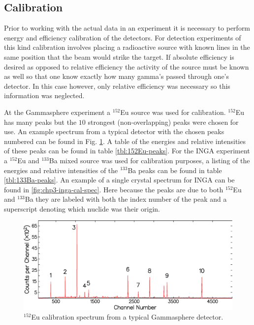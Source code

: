 \subsection{Calibration}
\label{ssec:exp-pr-data-proc-cal}
Prior to working with the actual data in an experiment it is necessary to perform energy and efficiency calibration of the detectors. For \gr{} detection experiments of this kind calibration involves placing a radioactive source with known lines in the same position that the beam would strike the target. If absolute efficiency is desired as opposed to relative efficiency the activity of the source must be known as well so that one know exactly how many gamma's passed through one's detector. In this case however, only relative efficiency was necessary so this information was neglected.

At the Gammasphere experiment a $^{152}$Eu source was used for calibration. $^{152}$Eu has many peaks but the $10$ strongest (non-overlapping) peaks were chosen for use. An example spectrum from a typical detector with the chosen peaks numbered can be found in Fig. \ref{fig:chp3-gs-cal-spec}.  A table of the energies and relative intensities of these peaks can be found in table \ref{tbl:152Eu-peaks}. For the INGA experiment a $^{152}$Eu and $^{133}$Ba mixed source was used for calibration purposes, a listing of the energies and relative intensities of the $^{133}$Ba peaks can be found in table \ref{tbl:133Ba-peaks}. An example of a single crystal spectrum for INGA can be found in \ref{fig:chp3-inga-cal-spec}. Here because the peaks are due to both $^{152}$Eu and $^{133}$Ba they are labeled with both the index number of the peak and a superscript denoting which nuclide was their origin.

\begin{figure}[h!]
	\centerline{\includegraphics[height=0.25\textheight]{./img/c3/gs_cal_spec.eps}}
	\caption{$^{152}$Eu calibration spectrum from a typical Gammasphere detector.}
	\label{fig:chp3-gs-cal-spec}
\end{figure}

